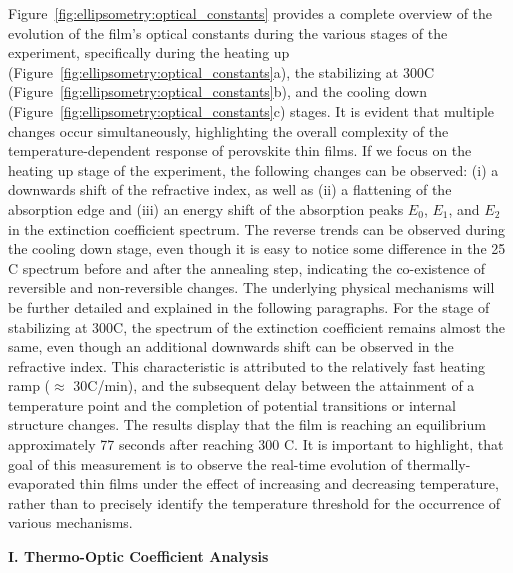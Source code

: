 Figure~\ref{fig:ellipsometry:optical_constants} provides a complete overview of the evolution of the film's optical constants during the various stages of the experiment, specifically during the heating up (Figure~\ref{fig:ellipsometry:optical_constants}a), the stabilizing at 300\degree C (Figure~\ref{fig:ellipsometry:optical_constants}b), and the cooling down (Figure~\ref{fig:ellipsometry:optical_constants}c) stages. It is evident that multiple changes occur simultaneously, highlighting the overall complexity of the temperature-dependent response of perovskite thin films. If we focus on the heating up stage of the experiment, the following changes can be observed: (i) a downwards shift of the refractive index, as well as (ii) a flattening of the absorption edge and (iii) an energy shift of the absorption peaks $E_0$, $E_1$, and $E_2$ in the extinction coefficient spectrum. The reverse trends can be observed during the cooling down stage, even though it is easy to notice some difference in the 25 \degree C spectrum before and after the annealing step, indicating the co-existence of reversible and non-reversible changes. The underlying physical mechanisms will be further detailed and explained in the following paragraphs. For the stage of stabilizing at 300\degree C, the spectrum of the extinction coefficient remains almost the same, even though an additional downwards shift can be observed in the refractive index. This characteristic is attributed to the relatively fast heating ramp ($\approx$ 30\degree C/min), and the subsequent delay between the attainment of a temperature point and the completion of potential transitions or internal structure changes. The results display that the film is reaching an equilibrium approximately 77 seconds after reaching  300 \degree C. It is important to highlight, that goal of this measurement is to observe the real-time evolution of thermally-evaporated  thin films under the effect of increasing and decreasing temperature, rather than to precisely identify the temperature threshold for the occurrence of various mechanisms. 




\textbf{I. Thermo-Optic Coefficient Analysis}

